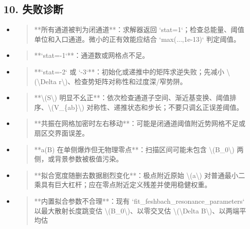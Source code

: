 \documentclass[UTF8,openany,11pt,fontset=fandol]{ctexbook}
\begin{document}
\subsection{\texorpdfstring{\textbf{10.
失败诊断}}{10. 失败诊断}}\label{ux5931ux8d25ux8bcaux65ad-2}

\begin{itemize}
\item
  \begin{quote}
  **所有通道被判为闭通道**：求解器返回
  `stat=1`；检查总能量、阈值单位和入口通道。微小的正有效能应结合
  `max(...,1e-13)` 判定阈值。
  \end{quote}
\item
  \begin{quote}
  **`stat=-1`**：通道数或网格点不足。
  \end{quote}
\item
  \begin{quote}
  **`stat=-2` 或 `-3`**：初始化或递推中的矩阵求逆失败；先减小
  \textbackslash(\textbackslash Delta
  r\textbackslash)、检查势矩阵对称性和过度深/窄势阱。
  \end{quote}
\item
  \begin{quote}
  **\textbackslash(S\textbackslash)
  明显不幺正**：依次检查通道子空间、渐近基变换、阈值排序、\textbackslash(V\_\{ab\}\textbackslash)
  对称性、递推状态和步长；不要只调幺正误差阈值。
  \end{quote}
\item
  \begin{quote}
  **共振在网格加密时左右移动**：可能是闭通道阈值附近势网格不足或扇区交界面误差。
  \end{quote}
\item
  \begin{quote}
  **a(B) 在单侧爆炸但无物理零点**：扫描区间可能未包含
  \textbackslash(B\_0\textbackslash) 两侧，或背景参数被极值污染。
  \end{quote}
\item
  \begin{quote}
  **拟合宽度随删去数据剧烈变化**：极点附近原始
  \textbackslash(\textbar a\textbar\textbackslash)
  对普通最小二乘具有巨大杠杆；应在零点附近定义残差并使用稳健权重。
  \end{quote}
\item
  \begin{quote}
  **内置拟合参数不合理**：现有 `fit\_feshbach\_resonance\_parameters`
  以最大散射长度跳变估 \textbackslash(B\_0\textbackslash)、以零交叉估
  \textbackslash(\textbackslash Delta B\textbackslash)、以两端平均估

\end{quote}
\end{itemize}
\end{document}
